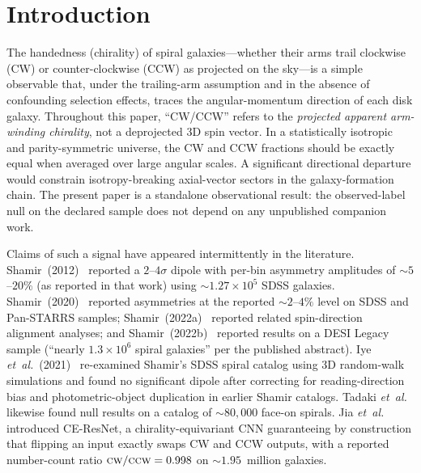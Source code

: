 \documentclass[twocolumn,linenumbers]{aastex702}
\newcommand{\CW}{\textsc{cw}}
\newcommand{\CCW}{\textsc{ccw}}
\newcommand{\sigmaunit}{\sigma}
\begin{document}

\section{Introduction}
\label{sec:intro}

The handedness (chirality) of spiral galaxies---whether their arms trail clockwise (CW) or counter-clockwise (CCW) as projected on the sky---is a simple observable that, under the trailing-arm assumption and in the absence of confounding selection effects, traces the angular-momentum direction of each disk galaxy. Throughout this paper, ``CW/CCW'' refers to the \emph{projected apparent arm-winding chirality}, not a deprojected 3D spin vector. In a statistically isotropic and parity-symmetric universe, the CW and CCW fractions should be exactly equal when averaged over large angular scales. A significant directional departure would constrain isotropy-breaking axial-vector sectors in the galaxy-formation chain. The present paper is a standalone observational result: the observed-label null on the declared sample does not depend on any unpublished companion work.

Claims of such a signal have appeared intermittently in the literature. Shamir~(2012)~\cite{Shamir:2012} reported a $2\text{--}4\sigmaunit$ dipole with per-bin asymmetry amplitudes of $\sim\!5$--$20\%$ (as reported in that work) using $\sim\!1.27\!\times\!10^{5}$ SDSS galaxies. Shamir~(2020)~\cite{Shamir:2020} reported asymmetries at the reported $\sim\!2$--$4\%$ level on SDSS and Pan-STARRS samples; Shamir~(2022a)~\cite{Shamir:2022} reported related spin-direction alignment analyses; and Shamir~(2022b)~\cite{Shamir:2022DESI} reported results on a DESI Legacy sample (``nearly $1.3\!\times\!10^{6}$ spiral galaxies'' per the published abstract). Iye \textit{et~al.}~(2021)~\cite{Iye:2021} re-examined Shamir's SDSS spiral catalog using 3D random-walk simulations and found no significant dipole after correcting for reading-direction bias and photometric-object duplication in earlier Shamir catalogs. Tadaki \textit{et~al.}~\cite{Tadaki:2020} likewise found null results on a catalog of $\sim\!80{,}000$ face-on spirals. Jia \textit{et~al.}~\cite{Jia:2023} introduced CE-ResNet, a chirality-equivariant CNN guaranteeing by construction that flipping an input exactly swaps CW and CCW outputs, with a reported number-count ratio $\CW/\CCW = 0.998$ on $\sim\!1.95$~million galaxies.
\end{document}

